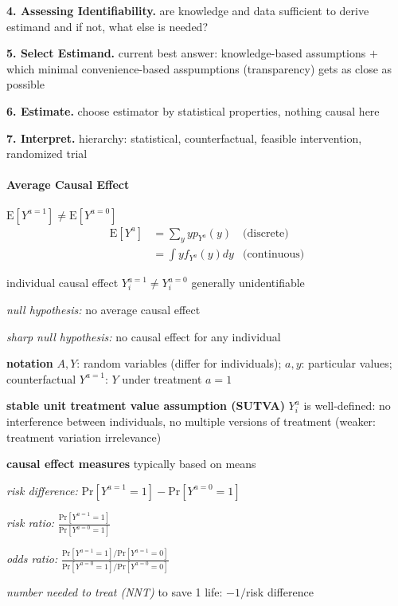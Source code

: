 \documentclass[8pt,twoside]{extarticle}
\renewcommand{\indent}{\hspace*{15pt}}
\begin{document}
\begin{multicols}{2}
 \textbf{4. Assessing Identifiability.} are knowledge and data sufficient to derive estimand and if not, what else is needed?

 \textbf{5. Select Estimand.} current best answer: knowledge-based assumptions $+$ which minimal convenience-based asspumptions (transparency) gets as close as possible

 \textbf{6. Estimate.} choose estimator by statistical properties, nothing causal here

 \textbf{7. Interpret.} hierarchy: statistical, counterfactual, feasible intervention, randomized trial


\paragraph{Average Causal Effect} $\mathrm{E}\left[Y^{a=1}\right] \neq \mathrm{E}\left[Y^{a=0}\right]$
\begin{align*}
\mathrm{E}\left[Y^{a}\right]   &=  \sum_yyp_{Y^a}(y)  &\text{(discrete)}\\[-0.5em]
   &=  \int yf_{Y^a}(y)dy &\text{(continuous)}
\end{align*}

 individual causal effect $Y_i^{a=1} \neq Y_i^{a=0}$ generally unidentifiable

 \textit{null hypothesis:} no average causal effect

 \textit{sharp null hypothesis:} no causal effect for any individual

 \textbf{notation} $A,Y$: random variables (differ for individuals);
$a,y$: particular values; counterfactual $Y^{a=1}$: $Y$ under treatment $a=1$

  \textbf{stable unit treatment value assumption (SUTVA)} $Y_i^a$ is well-defined: no interference between individuals, no multiple versions of treatment (weaker: treatment variation irrelevance)

  \textbf{causal effect measures} typically based on means

\indent \textit{risk difference:}  $\mathrm{Pr}\left[Y^{a=1}=1\right] - \mathrm{Pr}\left[Y^{a=0}=1\right]$

\indent \textit{risk ratio:} $\frac{\mathrm{Pr}\left[Y^{a=1}=1\right]}{ \mathrm{Pr}\left[Y^{a=0}=1\right]}$

\indent \textit{odds ratio:} $\frac{\mathrm{Pr}\left[Y^{a=1}=1\right]/\mathrm{Pr}\left[Y^{a=1}=0\right]}{ \mathrm{Pr}\left[Y^{a=0}=1\right]/\mathrm{Pr}\left[Y^{a=0}=0\right]}$

 \textit{number needed to treat (NNT)} to save 1 life: $-1/$risk difference


\end{multicols}
\end{document}

